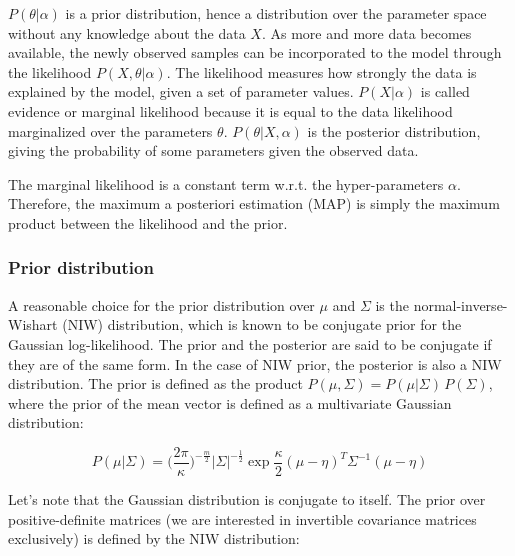             $P(\theta \vert \alpha)$ is a prior distribution, hence a distribution over the parameter space without
            any knowledge about the data $X$. As more and more data becomes available, the newly observed samples can be
            incorporated to the model through the likelihood $P(X, \theta \vert \alpha)$. The likelihood measures how strongly
            the data is explained by the model, given a set of parameter values. $P(X \vert \alpha)$ is called evidence or
            marginal likelihood because it is equal to the data likelihood marginalized over the parameters $\theta$.
            $P(\theta \vert X, \alpha)$ is the posterior distribution, giving the probability of some parameters given  %
            the observed data.

            The marginal likelihood is a constant term w.r.t. the hyper-parameters $\alpha$. Therefore, the maximum  %
            a posteriori estimation (MAP) is simply the maximum product between the likelihood and the prior.

        \subsubsection{Prior distribution}

            A reasonable choice for the prior distribution over $\mu$ and $\Sigma$ is the normal-inverse-Wishart (NIW)
            distribution, which is known to be conjugate prior for the Gaussian log-likelihood.
            The prior and the posterior are said to be conjugate if they are of the same form. In the case of NIW prior,
            the posterior is also a NIW distribution. The prior is defined as the product
            $P(\mu, \Sigma) = P(\mu \vert \Sigma)\,P(\Sigma)$, where the prior of the mean vector is defined as a multivariate
            Gaussian distribution:

            \begin{equation}  %
                P(\mu \vert \Sigma) = \Big(\frac{2 \pi}{\kappa}\Big)^{-\frac{m}{2}} \vert\Sigma\vert^{-\frac{1}{2}}
                \exp{\frac{\kappa}{2} (\mu - \eta)^T \Sigma^{-1} (\mu - \eta)}
            \end{equation}

            Let's note that the Gaussian distribution is conjugate to itself. The prior over positive-definite matrices
            (we are interested in invertible covariance matrices exclusively) is defined by the NIW distribution:

